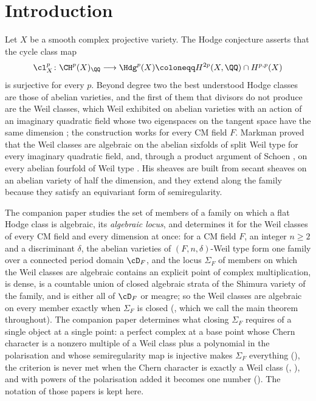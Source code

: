 \section{Introduction}\label{sec:intro}

Let $X$ be a smooth complex projective variety. The Hodge conjecture asserts
that the cycle class map
\[
  \cl^{p}_{X}\colon \CH^{p}(X)_{\QQ}\longrightarrow \Hdg^{p}(X)
  \coloneqq H^{2p}(X,\QQ)\cap H^{p,p}(X)
\]
is surjective for every $p$. Beyond degree two the best understood Hodge
classes are those of abelian varieties, and the first of them that divisors
do not produce are the Weil classes, which Weil exhibited on abelian
varieties with an action of an imaginary quadratic field whose two
eigenspaces on the tangent space have the same dimension \cite{Weil77}; the
construction works for every CM field $F$. Markman proved that the Weil
classes are algebraic on the abelian sixfolds of split Weil type for every
imaginary quadratic field, and, through a product argument of Schoen
\cite[Proposition~10]{Sch98}, on every abelian fourfold of Weil type
\cite{Mar25a,Mar25b}. His sheaves are built from secant sheaves on an abelian
variety of half the dimension, and they extend along the family because they
satisfy an equivariant form of semiregularity.

The companion paper \cite{paperI} studies the set of members of a family on
which a flat Hodge class is algebraic, its \emph{algebraic locus}, and
determines it for the Weil classes of every CM field and every dimension at
once: for a CM field $F$, an integer $n\ge2$ and a discriminant $\delta$, the
abelian varieties of $(F,n,\delta)$-Weil type form one family over a
connected period domain $\cD_{F}$, and the locus $\Sigma_{F}$ of members on
which the Weil classes are algebraic contains an explicit point of complex
multiplication, is dense, is a countable union of closed algebraic strata of
the Shimura variety of the family, and is either all of $\cD_{F}$ or meagre;
so the Weil classes are algebraic on every member exactly when $\Sigma_{F}$
is closed (\cite[Theorem~1.1]{paperI}, which we call the main theorem throughout). The
companion paper \cite{paperII} determines what closing $\Sigma_{F}$ requires
of a single object at a single point: a perfect complex at a base point
whose Chern character is a nonzero multiple of a Weil class plus a
polynomial in the polarisation and whose semiregularity map is injective
makes $\Sigma_{F}$ everything (\cite[Theorem~2.3]{paperII}), the criterion is
never met when the Chern character is exactly a Weil class
(\cite[Theorem~3.5]{paperII}, \cite[Theorem~5.4]{paperII}), and with powers of the
polarisation added it becomes one number (\cite[Theorem~3.9]{paperII}). The
notation of those papers is kept here.


